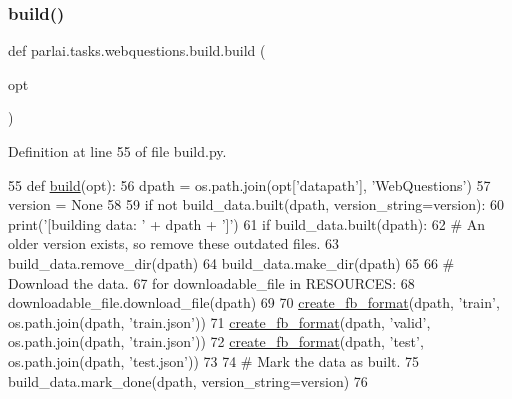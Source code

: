 \subsubsection{\texorpdfstring{build()}{build()}}
{\footnotesize\ttfamily def parlai.\+tasks.\+webquestions.\+build.\+build (\begin{DoxyParamCaption}\item[{}]{opt }\end{DoxyParamCaption})}



Definition at line 55 of file build.\+py.


\begin{DoxyCode}
55 \textcolor{keyword}{def }\hyperlink{namespacedialog__babi__feedback_1_1build_a7a9d289f7493a5ded13c4b7f071b6184}{build}(opt):
56     dpath = os.path.join(opt[\textcolor{stringliteral}{'datapath'}], \textcolor{stringliteral}{'WebQuestions'})
57     version = \textcolor{keywordtype}{None}
58 
59     \textcolor{keywordflow}{if} \textcolor{keywordflow}{not} build\_data.built(dpath, version\_string=version):
60         print(\textcolor{stringliteral}{'[building data: '} + dpath + \textcolor{stringliteral}{']'})
61         \textcolor{keywordflow}{if} build\_data.built(dpath):
62             \textcolor{comment}{# An older version exists, so remove these outdated files.}
63             build\_data.remove\_dir(dpath)
64         build\_data.make\_dir(dpath)
65 
66         \textcolor{comment}{# Download the data.}
67         \textcolor{keywordflow}{for} downloadable\_file \textcolor{keywordflow}{in} RESOURCES:
68             downloadable\_file.download\_file(dpath)
69 
70         \hyperlink{namespaceparlai_1_1tasks_1_1wikiqa_1_1build_a554828702769592403db58c955d1dfe3}{create\_fb\_format}(dpath, \textcolor{stringliteral}{'train'}, os.path.join(dpath, \textcolor{stringliteral}{'train.json'}))
71         \hyperlink{namespaceparlai_1_1tasks_1_1wikiqa_1_1build_a554828702769592403db58c955d1dfe3}{create\_fb\_format}(dpath, \textcolor{stringliteral}{'valid'}, os.path.join(dpath, \textcolor{stringliteral}{'train.json'}))
72         \hyperlink{namespaceparlai_1_1tasks_1_1wikiqa_1_1build_a554828702769592403db58c955d1dfe3}{create\_fb\_format}(dpath, \textcolor{stringliteral}{'test'}, os.path.join(dpath, \textcolor{stringliteral}{'test.json'}))
73 
74         \textcolor{comment}{# Mark the data as built.}
75         build\_data.mark\_done(dpath, version\_string=version)
76 \end{DoxyCode}
\mbox{\label{namespaceparlai_1_1tasks_1_1webquestions_1_1build_aba751402cc3a79acbe7517832498a7e6}} 
